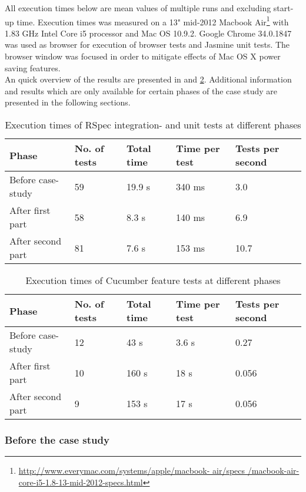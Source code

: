 
All execution times below are mean values of multiple runs and excluding
start-up time. Execution times was measured on a 13" mid-2012 Macbook
Air\footnote{\url{http://www.everymac.com/systems/apple/macbook-
air/specs /macbook-air-core-i5-1.8-13-mid-2012-specs.html}} with 1.83
GHz Intel Core i5 processor and Mac OS 10.9.2. Google Chrome 34.0.1847
was used as browser for execution of browser tests and Jasmine unit
tests. The browser window was focused in order to mitigate effects of
Mac OS X power saving features.\\

An quick overview of the results are presented in 
and \ref{tab:cucumber_times}. Additional information and results which
are only available for certain phases of the case study are presented in
the following sections.\\

\begin{table}[t]
    \centering
    \begin{tabular}{l l l l l}
        Phase & No. of tests & Total time & Time per test & Tests per second\\
        \hline
        Before case-study & 59 & 19.9 s& 340 ms & 3.0 \\
        After first part  & 58 & 8.3 s & 140 ms & 6.9 \\
        After second part & 81 & 7.6 s  & 153 ms & 10.7\\
    \end{tabular}
    \caption{ Execution times of RSpec integration- and unit tests at different phases }
    \label{tab:unit_times}
\end{table}


\begin{table}[t]
    \centering
    \begin{tabular}{l l l l l}
        Phase & No. of tests & Total time & Time per test & Tests per second \\
        \hline
        Before case-study & 12 & 43 s & 3.6 s & 0.27 \\
        After first part  & 10 & 160 s & 18 s & 0.056\\
        After second part & 9 &  153 s & 17 s & 0.056\\
    \end{tabular}
    \caption{ Execution times of Cucumber feature tests at different phases }
    \label{tab:cucumber_times}
\end{table}


\subsubsection{Before the case study}

